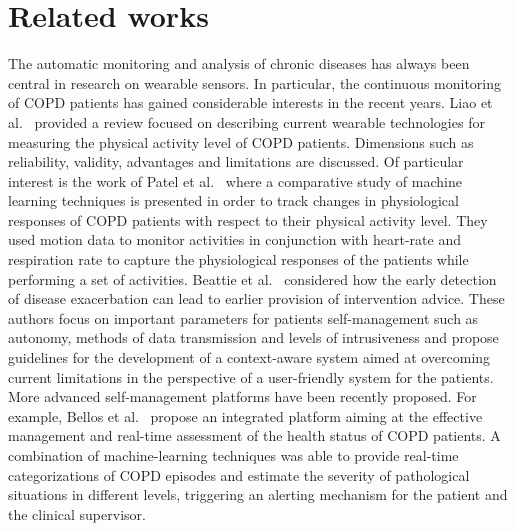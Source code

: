 \section{Related works}

The automatic monitoring and analysis of chronic diseases has always been central in research on wearable sensors. In particular, the continuous monitoring of COPD patients has gained considerable interests in the recent years. Liao et al.~\cite{Liao_2014} provided a review focused on describing current wearable technologies for measuring the physical activity level of COPD patients. Dimensions such as reliability, validity, advantages and limitations are discussed. Of particular interest is the work of Patel et al.~\cite{Patel_2007} where a comparative study of machine learning techniques is presented in order to track changes in physiological responses of COPD patients with respect to their physical activity level. They used motion data to monitor activities in conjunction with heart-rate and respiration rate to capture the physiological responses of the patients while performing a set of activities. Beattie et al.~\cite{Beattie_2014} considered how the early detection of disease exacerbation can lead to earlier provision of intervention advice. These authors focus on important parameters for patients self-management such as autonomy, methods of data transmission and levels of intrusiveness and propose guidelines for the development of a context-aware system aimed at overcoming current limitations in the perspective of a user-friendly system for the patients. More advanced self-management platforms have been recently proposed. For example, Bellos et al.~\cite{Bellos_2014} propose an integrated platform aiming at the effective management and real-time assessment of the health status of COPD patients.
A combination of machine-learning techniques was able to provide real-time categorizations of COPD episodes  and estimate the severity of pathological situations in different levels, triggering an alerting mechanism for the patient and the clinical supervisor. 

